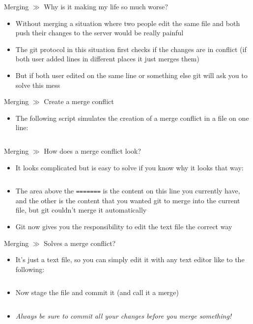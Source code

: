 \documentclass[10pt]{beamer}
\begin{document}
\begin{frame}{Merging $\gg$ Why is it making my life so much worse?}
	\begin{itemize}
		\item Without merging a situation where two people edit the same file and both push their changes to the server would be really painful
		\item The git protocol in this situation first checks if the changes are in conflict (if both user added lines in different places it just merges them)
		\item But if both user edited on the same line or something else git will ask you to solve this mess
	\end{itemize}
\end{frame}

\begin{frame}{Merging $\gg$ Create a merge conflict}
	\begin{itemize}
		\item The following script simulates the creation of a merge conflict in a file on one line:
		\href{https://jonathanmh.com/how-to-create-a-git-merge-conflict/}{}
		\inputminted[bgcolor=lightGreyCustom,fontsize=\scriptsize]{sh}{./resources/git_merging_03_create_conflict.sh}
	\end{itemize}
\end{frame}

\begin{frame}{Merging $\gg$ How does a merge conflict look?}
	\begin{itemize}
		\item It looks complicated but is easy to solve if you know why it looks that way:
		\inputminted[bgcolor=lightGreyCustom,fontsize=\scriptsize]{diff}{./resources/git_merging_04_create_conflict_output.sh}
		\item The area above the \texttt{=======} is the content on this line you currently have, and the other is the content that you wanted git to merge into the current file, but git couldn't merge it automatically
		\item Git now gives you the responsibility to edit the text file the correct way
	\end{itemize}
\end{frame}

\begin{frame}{Merging $\gg$ Solves a merge conflict?}
\begin{itemize}
		\item It's just a text file, so you can simply edit it with any text editor like to the following:
		\inputminted[bgcolor=lightGreyCustom,fontsize=\scriptsize]{sh}{./resources/git_merging_05_create_conflict_solved.sh}
		\item Now stage the file and commit it (and call it a merge)
		\inputminted[bgcolor=lightGreyCustom,fontsize=\scriptsize]{sh}{./resources/git_merging_06_merge_commit.sh}
		\item \textit{Always be sure to commit all your changes before you merge something!}
	\end{itemize}
\end{frame}
\end{document}
